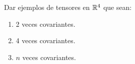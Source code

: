 \item Dar ejemplos de tensores en $\mathbb{R}^4$ que sean:
    \begin{enumerate}
        \item 2 veces covariantes.
            \begin{mdframed}[style=s]
                
            \end{mdframed}
        \item 4 veces covariantes.
            \begin{mdframed}[style=s]
                
            \end{mdframed}
        \item $n$ veces covariantes.
            \begin{mdframed}[style=s]
                
            \end{mdframed}
    \end{enumerate}